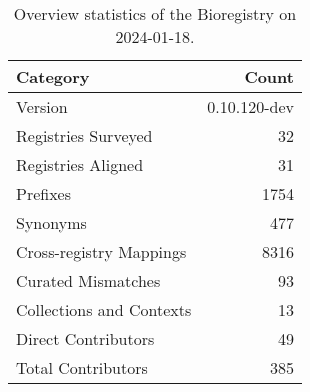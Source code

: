 \begin{table}
\caption{Overview statistics of the Bioregistry on 2024-01-18.}
\label{tab:bioregistry-summary}
\begin{tabular}{lr}
\toprule
Category & Count \\
\midrule
Version & 0.10.120-dev \\
Registries Surveyed & 32 \\
Registries Aligned & 31 \\
Prefixes & 1754 \\
Synonyms & 477 \\
Cross-registry Mappings & 8316 \\
Curated Mismatches & 93 \\
Collections and Contexts & 13 \\
Direct Contributors & 49 \\
Total Contributors & 385 \\
\bottomrule
\end{tabular}
\end{table}
